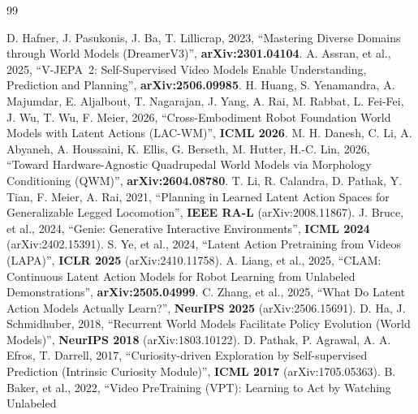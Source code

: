 \documentclass[12pt,a4paper,oneside]{report}
\begin{document}

\begin{thebibliography}{99}
  \setlength{\itemsep}{4pt}

   D. Hafner, J. Pasukonis, J. Ba, T. Lillicrap, 2023, ``Mastering Diverse Domains through
    World Models (DreamerV3)'', \textbf{arXiv:2301.04104}.
   A. Assran, et al., 2025, ``V-JEPA~2: Self-Supervised Video Models Enable Understanding,
    Prediction and Planning'', \textbf{arXiv:2506.09985}.
   H. Huang, S. Yenamandra, A. Majumdar, E. Aljalbout, T. Nagarajan, J. Yang, A. Rai,
    M. Rabbat, L. Fei-Fei, J. Wu, T. Wu, F. Meier, 2026, ``Cross-Embodiment Robot Foundation World Models with
    Latent Actions (LAC-WM)'', \textbf{ICML 2026}.
   M. H. Danesh, C. Li, A. Abyaneh, A. Houssaini, K. Ellis, G. Berseth, M. Hutter,
    H.-C. Lin, 2026, ``Toward Hardware-Agnostic Quadrupedal World Models via Morphology Conditioning (QWM)'',
    \textbf{arXiv:2604.08780}.
   T. Li, R. Calandra, D. Pathak, Y. Tian, F. Meier, A. Rai, 2021, ``Planning in Learned Latent
    Action Spaces for Generalizable Legged Locomotion'', \textbf{IEEE RA-L} (arXiv:2008.11867).
   J. Bruce, et al., 2024, ``Genie: Generative Interactive Environments'', \textbf{ICML 2024}
    (arXiv:2402.15391).
   S. Ye, et al., 2024, ``Latent Action Pretraining from Videos (LAPA)'', \textbf{ICLR 2025}
    (arXiv:2410.11758).
   A. Liang, et al., 2025, ``CLAM: Continuous Latent Action Models for Robot Learning from
    Unlabeled Demonstrations'', \textbf{arXiv:2505.04999}.
   C. Zhang, et al., 2025, ``What Do Latent Action Models Actually Learn?'', \textbf{NeurIPS
    2025} (arXiv:2506.15691).
   D. Ha, J. Schmidhuber, 2018, ``Recurrent World Models Facilitate Policy Evolution (World
    Models)'', \textbf{NeurIPS 2018} (arXiv:1803.10122).
   D. Pathak, P. Agrawal, A. A. Efros, T. Darrell, 2017, ``Curiosity-driven Exploration by
    Self-supervised Prediction (Intrinsic Curiosity Module)'', \textbf{ICML 2017} (arXiv:1705.05363).
   B. Baker, et al., 2022, ``Video PreTraining (VPT): Learning to Act by Watching Unlabeled

\end{thebibliography}
\end{document}
